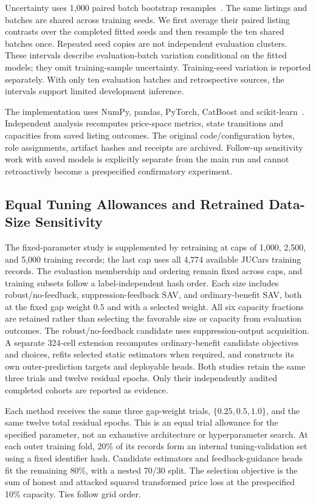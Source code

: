 \documentclass[10pt,journal]{IEEEtran}
\begin{document}
Uncertainty uses 1,000 paired batch bootstrap
resamples~\cite{efron1979bootstrap,cameron2015clusters}. The same listings
and batches are shared across training seeds. We first average their
paired listing contrasts over the completed fitted seeds and then
resample the ten shared batches once. Repeated seed copies are not
independent evaluation clusters. These intervals describe evaluation-batch
variation conditional on the fitted models; they omit training-sample
uncertainty. Training-seed variation is reported separately. With only
ten evaluation batches and retrospective sources, the intervals support
limited development inference.

The implementation uses NumPy, pandas, PyTorch, CatBoost and
scikit-learn~\cite{pedregosa2011sklearn}. Independent analysis recomputes
price-space metrics, state transitions and capacities from saved listing
outcomes. The original code/configuration bytes, role assignments,
artifact hashes and receipts are archived. Follow-up sensitivity work
with saved models is explicitly separate from the main run and cannot
retroactively become a prespecified confirmatory experiment.

\subsection{Equal Tuning Allowances and Retrained Data-Size Sensitivity}

The fixed-parameter study is supplemented by retraining at caps of 1,000,
2,500, and 5,000 training records; the last cap uses all 4,774 available JUCars
training records. The evaluation membership and ordering remain fixed across
caps, and training subsets follow a label-independent hash order. Each size
includes robust/no-feedback, suppression-feedback SAV, and ordinary-benefit
SAV, both at the fixed gap weight $0.5$ and with a selected weight. All six
capacity fractions are retained rather than selecting the favorable size or
capacity from evaluation outcomes. The robust/no-feedback candidate uses
suppression-output acquisition. A separate 324-cell extension recomputes
ordinary-benefit candidate objectives and choices, refits selected static
estimators when required, and constructs its own outer-prediction targets and
deployable heads. Both studies retain the same three trials and twelve
residual epochs. Only their independently audited completed cohorts are
reported as evidence.

Each method receives the same three gap-weight trials, $\{0.25,0.5,1.0\}$,
and the same twelve total residual epochs. This is an equal trial allowance
for the specified parameter, not an exhaustive architecture or hyperparameter
search. At each outer training fold, 20\% of its records form an internal
tuning-validation set using a fixed identifier hash. Candidate estimators and
feedback-guidance heads fit the remaining 80\%, with a nested 70/30 split.
The selection objective is the sum of honest and attacked squared transformed
price loss at the prespecified 10\% capacity. Ties follow grid order.
\end{document}
